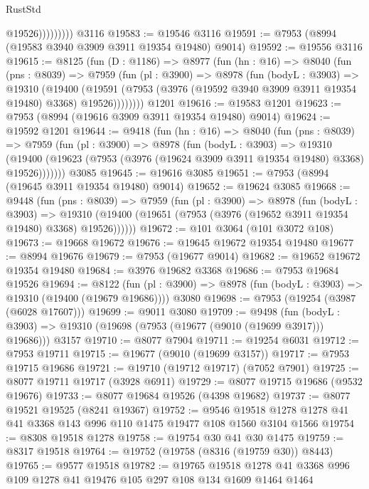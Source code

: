 \begin{lexlean}{RustStd}
\begin{coremodule}
                      @19526)))))))))
    @3116
@19583 := @19546 @3116
@19591 := @7953 (@8994 (@19583 @3940 @3909 @3911 @19354 @19480) @9014)
@19592 := @19556 @3116
@19615 := @8125
    (fun (D : @1186) =>
    @8977
      (fun (hn : @16) =>
      @8040
        (fun (pns : @8039) =>
        @7959
          (fun (pl : @3900) =>
          @8978
            (fun (bodyL : @3903) =>
            @19310
              (@19400
                (@19591 (@7953 (@3976 (@19592 @3940 @3909 @3911 @19354 @19480) @3368) @19526))))))))
    @1201
@19616 := @19583 @1201
@19623 := @7953 (@8994 (@19616 @3909 @3911 @19354 @19480) @9014)
@19624 := @19592 @1201
@19644 := @9418
    (fun (hn : @16) =>
    @8040
      (fun (pns : @8039) =>
      @7959
        (fun (pl : @3900) =>
        @8978
          (fun (bodyL : @3903) =>
          @19310
            (@19400 (@19623 (@7953 (@3976 (@19624 @3909 @3911 @19354 @19480) @3368) @19526)))))))
    @3085
@19645 := @19616 @3085
@19651 := @7953 (@8994 (@19645 @3911 @19354 @19480) @9014)
@19652 := @19624 @3085
@19668 := @9448
    (fun (pns : @8039) =>
    @7959
      (fun (pl : @3900) =>
      @8978
        (fun (bodyL : @3903) =>
        @19310 (@19400 (@19651 (@7953 (@3976 (@19652 @3911 @19354 @19480) @3368) @19526))))))
@19672 := @101 @3064 (@101 @3072 @108)
@19673 := @19668 @19672
@19676 := @19645 @19672 @19354 @19480
@19677 := @8994 @19676
@19679 := @7953 (@19677 @9014)
@19682 := @19652 @19672 @19354 @19480
@19684 := @3976 @19682 @3368
@19686 := @7953 @19684 @19526
@19694 := @8122
    (fun (pl : @3900) => @8978 (fun (bodyL : @3903) => @19310 (@19400 (@19679 @19686))))
    @3080
@19698 := @7953 (@19254 (@3987 (@6028 @17607)))
@19699 := @9011 @3080
@19709 := @9498
    (fun (bodyL : @3903) => @19310 (@19698 (@7953 (@19677 (@9010 (@19699 @3917))) @19686)))
    @3157
@19710 := @8077 @7904
@19711 := @19254 @6031
@19712 := @7953 @19711
@19715 := @19677 (@9010 (@19699 @3157))
@19717 := @7953 @19715 @19686
@19721 := @19710 (@19712 @19717) (@7052 @7901)
@19725 := @8077 @19711 @19717 (@3928 @6911)
@19729 := @8077 @19715 @19686 (@9532 @19676)
@19733 := @8077 @19684 @19526 (@4398 @19682)
@19737 := @8077 @19521 @19525 (@8241 @19367)
@19752 := @9546 @19518 @1278 @1278 @41 @41 @3368 @143 @996 @110 @1475 @19477 @108 @1560 @3104 @1566
@19754 := @8308 @19518 @1278
@19758 := @19754 @30 @41 @30 @1475
@19759 := @8317 @19518
@19764 := @19752 (@19758 (@8316 (@19759 @30)) @8443)
@19765 := @9577 @19518
@19782 := @19765
    @19518
    @1278
    @41
    @3368
    @996
    @109
    @1278
    @41
    @19476
    @105
    @297
    @108
    @134
    @1609
    @1464
    @1464

\end{coremodule}
\end{lexlean}
